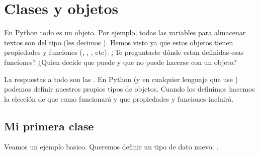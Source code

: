\documentclass[a5paper,9pt,spanish]{sphinxmanual}
\begin{document}
\chapter{Clases y objetos}
\label{\detokenize{class:clases-y-objetos}}\label{\detokenize{class::doc}}
\sphinxAtStartPar
En Python todo es un objeto. Por ejemplo, todas las variables para almacenar
textos son  del tipo  (les decimos ).
Hemos visto ya que estos objetos tienen propiedades y funciones (,
, , etc).
¿Te preguntaste dónde estan definidas esas funciones?
¿Quien decide que puede y que no puede hacerse con un objeto?

\sphinxAtStartPar
La respuestas a todo son las . En Python (y en cualquier lenguaje que use
) podemos definir nuestros propios tipos de objetos.
Cuando los definimos hacemos la elección de que como funcionará y que propiedades y
funciones incluirá.


\section{Mi primera clase}
\label{\detokenize{class:mi-primera-clase}}
\sphinxAtStartPar
Veamos un ejemplo basico. Queremos definir un tipo de dato nuevo: .
\end{document}
